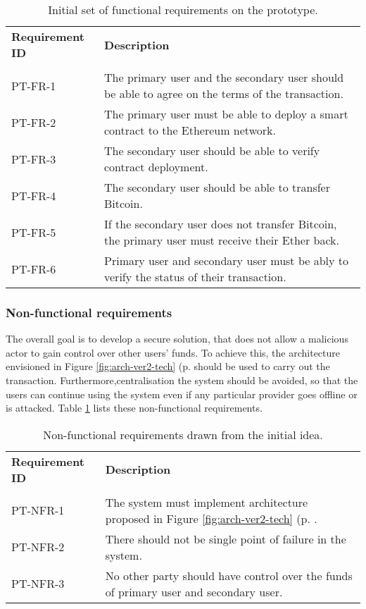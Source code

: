 \begin{table}[ht]
    \centering
    \begin{tabularx}{\textwidth}{|l X|}
    \hline
    \textbf{Requirement ID}& \textbf{Description}\\
    &\\
    PT-FR-1 & The primary user and the secondary user should be able to agree on the terms of the transaction.\\
    PT-FR-2 & The primary user must be able to deploy a smart contract to the Ethereum network.\\
    PT-FR-3 & The secondary user should be able to verify contract deployment.\\
    PT-FR-4 & The secondary user should be able to transfer Bitcoin.\\
    PT-FR-5 & If the secondary user does not transfer Bitcoin, the primary user must receive their Ether back.\\
    PT-FR-6 & Primary user and secondary user must be ably to verify the status of their transaction.\\
    \hline
    \end{tabularx}
    \caption{Initial set of functional requirements on the prototype.}
    \label{tab:pt-func-reqs}
    \end{table}
% 
\subsubsection{Non-functional requirements}
The overall goal is to develop a secure solution, that does not allow a malicious actor to gain control over other users' funds. To achieve this, the architecture envisioned in Figure \ref{fig:arch-ver2-tech} (p. \pageref{fig:arch-ver2-tech} should be used to carry out the transaction. Furthermore,centralisation the system should be avoided, so that the users can continue using the system even if any particular provider goes offline or is attacked. Table \ref{tab:pt-func-reqs} lists these non-functional requirements.

\begin{table}[ht]
    \centering
    \begin{tabularx}{\textwidth}{|l X|}
    \hline
    \textbf{Requirement ID}&\textbf{Description}\\
    &\\
    PT-NFR-1&The system must implement architecture proposed in Figure \ref{fig:arch-ver2-tech} (p. \pageref{fig:arch-ver2-tech}.\\
    PT-NFR-2&There should not be single point of failure in the system.\\
    PT-NFR-3&No other party should have control over the funds of primary user and secondary user.\\
    \hline
    \end{tabularx}
    
    \caption{Non-functional requirements drawn from the initial idea.}
    \label{tab:pt-nonfunc-reqs}
\end{table}

